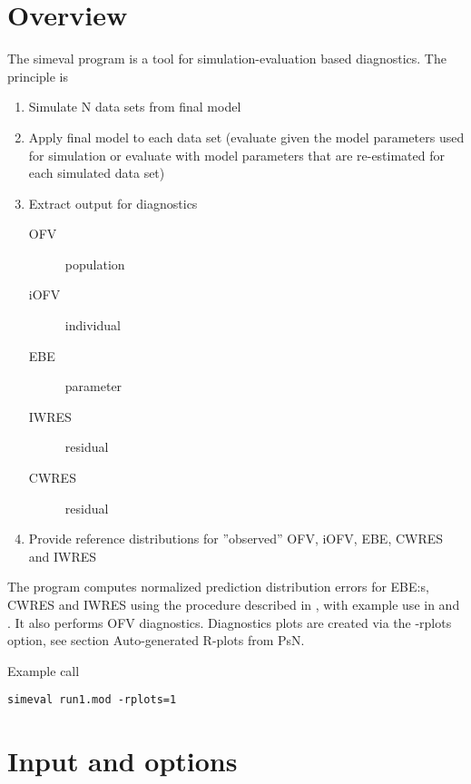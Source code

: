 



\maketitle
\newcommand{\guidetoolname}{simeval}


\section{Overview}

The simeval program is a tool for simulation-evaluation based diagnostics.
The principle is 
\begin{enumerate}
\item Simulate N data sets from final model
\item Apply final model to each data set
(evaluate given the model parameters used for simulation or evaluate with
model parameters that are re-estimated for each simulated data set)
\item Extract output for diagnostics
\begin{description}
\item[OFV] population
\item[iOFV] individual
\item[EBE] parameter
\item[IWRES] residual
\item[CWRES] residual
\end{description}
\item Provide reference distributions for ”observed” OFV, iOFV, EBE, CWRES and IWRES
\end{enumerate}
The program computes normalized prediction distribution errors for EBE:s, CWRES and IWRES 
using the procedure described in \cite{Comets}, with example use in \cite{Keizer} and \cite{Largajolli}.
It also performs OFV diagnostics. Diagnostics plots are created via the -rplots option, see section 
Auto-generated R-plots from PsN.

Example call
\begin{verbatim}
simeval run1.mod -rplots=1
\end{verbatim}

\section{Input and options}

